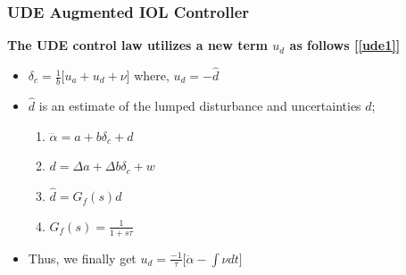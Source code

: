 \documentclass[table,10pt,red]{beamer}	%
\begin{document}
\begin{frame}
\frametitle{UDE Augmented IOL Controller}
\textbf{The UDE control law utilizes a new term $u_d$ as follows [\ref{ude1}]}
\begin{itemize}  %
		\item $\delta_c = \frac{1}{b}\Big[u_a+u_d+\nu\Big]$ where, $u_d = -\hat{d}$
		\item $\hat{d}$ is an estimate of the lumped disturbance and uncertainties $d$;

		\begin{enumerate}
			\item $\dddot{\alpha} = a + b\delta_c + d$
			\item $d = \Delta a + \Delta b \delta_c + w$
			\item $\hat{d}=G_f(s)d$
			\item $G_f(s)=\frac{1}{1+s\tau}$ \\
		\end{enumerate}
\end{itemize}

\begin{itemize}
	\item Thus, we finally get
	$u_d=\frac{-1}{\tau}\Big[\ddot{\alpha}-\int{\nu dt}\Big] \label{ude}$
	
\end{itemize}

\end{frame}
\end{document}
